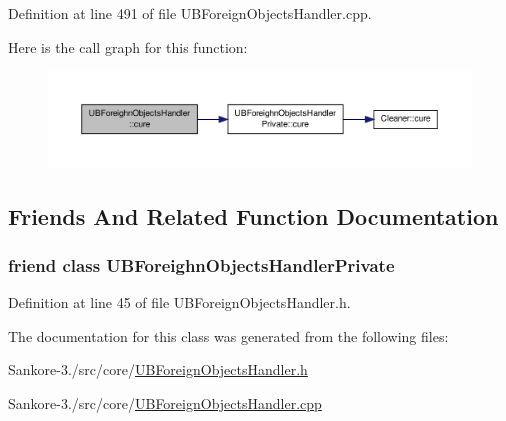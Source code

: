 Definition at line 491 of file U\-B\-Foreign\-Objects\-Handler.\-cpp.



Here is the call graph for this function\-:
\nopagebreak
\begin{figure}[H]
\begin{center}
\leavevmode
\includegraphics[width=350pt]{d5/d42/class_u_b_foreighn_objects_handler_a37ec4c04bad6f3a5c1259dc6b306f425_cgraph}
\end{center}
\end{figure}




\subsection{Friends And Related Function Documentation}
\hypertarget{class_u_b_foreighn_objects_handler_a0b2645e0bd54a21d25bbb40327b0edde}{
\subsubsection[{U\-B\-Foreighn\-Objects\-Handler\-Private}]{\setlength{\rightskip}{0pt plus 5cm}friend class {\bf U\-B\-Foreighn\-Objects\-Handler\-Private}\hspace{0.3cm}{\ttfamily [friend]}}}\label{d5/d42/class_u_b_foreighn_objects_handler_a0b2645e0bd54a21d25bbb40327b0edde}


Definition at line 45 of file U\-B\-Foreign\-Objects\-Handler.\-h.



The documentation for this class was generated from the following files\-:\begin{DoxyCompactItemize}
\item 
Sankore-\/3./src/core/\hyperlink{_u_b_foreign_objects_handler_8h}{U\-B\-Foreign\-Objects\-Handler.\-h}\item 
Sankore-\/3./src/core/\hyperlink{_u_b_foreign_objects_handler_8cpp}{U\-B\-Foreign\-Objects\-Handler.\-cpp}\end{DoxyCompactItemize}
